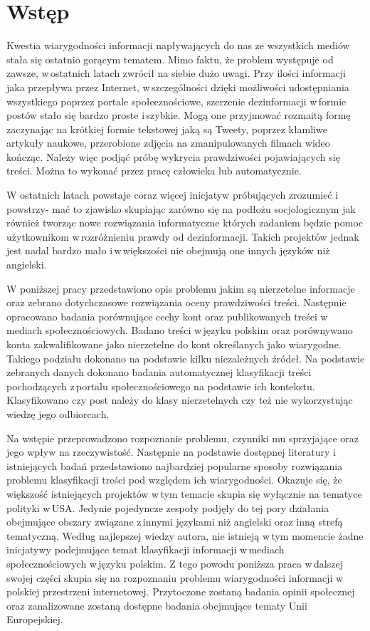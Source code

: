 \newpage %
\section{Wstęp}
Kwestia wiarygodności informacji napływających do nas ze wszystkich mediów stała się ostatnio gorącym tematem. Mimo faktu, że problem występuje od zawsze, w\,ostatnich latach zwrócił na siebie dużo uwagi. Przy ilości informacji jaka przepływa przez Internet, w\,szczególności dzięki możliwości udostępniania wszystkiego poprzez portale społecznościowe, szerzenie dezinformacji w\,formie postów stało się bardzo proste i\,szybkie. Mogą one przyjmować rozmaitą formę zaczynając na krótkiej formie tekstowej jaką są Tweety, poprzez kłamliwe artykuły naukowe, przerobione zdjęcia na zmanipulowanych filmach wideo kończąc. Należy więc podjąć próbę wykrycia prawdziwości pojawiających się treści. Można to wykonać przez pracę człowieka lub automatycznie.
\par
W ostatnich latach powstaje coraz więcej inicjatyw próbujących zrozumieć i\,powstrzy- mać to zjawisko skupiając zarówno się na podłożu socjologicznym jak również tworząc nowe rozwiązania informatyczne których zadaniem będzie pomoc użytkownikom w\,rozróżnieniu prawdy od dezinformacji. Takich projektów jednak jest nadal bardzo mało i\,w\,większości nie obejmują one innych języków niż angielski.
\par
W poniższej pracy przedstawiono opis problemu jakim są nierzetelne informacje oraz zebrano dotychczasowe rozwiązania oceny prawdziwości treści. Następnie opracowano badania porównujące cechy kont oraz publikowanych treści w\,mediach społecznościowych. Badano treści w\,języku polskim oraz porównywano konta zakwalifikowane jako nierzetelne do kont określanych jako wiarygodne. Takiego podziału dokonano na podstawie kilku niezależnych źródeł. Na podstawie zebranych danych dokonano badania automatycznej klasyfikacji treści pochodzących z\,portalu społecznościowego na podstawie ich kontekstu. Klasyfikowano czy post należy do klasy nierzetelnych czy też nie wykorzystując wiedzę jego odbiorcach.
\par
Na wstępie przeprowadzono rozpoznanie problemu, czynniki mu sprzyjające oraz jego wpływ na rzeczywistość. Następnie na podstawie dostępnej literatury i\,istniejących badań przedstawiono najbardziej popularne sposoby rozwiązania problemu klasyfikacji treści pod względem ich wiarygodności. 
Okazuje się, że większość istniejących projektów w\,tym temacie skupia się wyłącznie na tematyce polityki w\,USA. Jedynie pojedyncze zespoły podjęły do tej pory działania obejmujące obszary związane z\,innymi językami niż angielski oraz inną strefą tematyczną. Według najlepszej wiedzy autora, nie istnieją w\,tym momencie żadne inicjatywy podejmujące temat klasyfikacji informacji w\,mediach społecznościowych w\,języku polskim. Z tego powodu poniższa praca w\,dalszej swojej części skupia się na rozpoznaniu problemu wiarygodności informacji w\,polskiej przestrzeni internetowej. Przytoczone zostaną badania opinii społecznej oraz zanalizowane zostaną dostępne badania obejmujące tematy Unii Europejskiej. 
